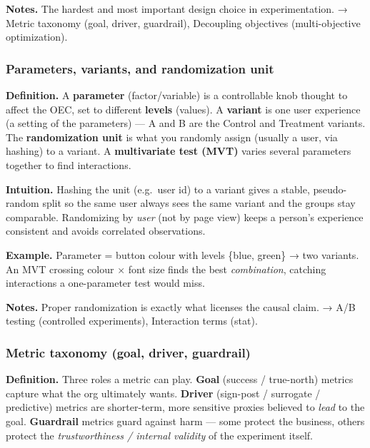 \documentclass[
  10pt,
  letterpaper,
  onecolumn]{article}
\begin{document}
\textbf{Notes.} The hardest and most important design choice in
experimentation. → Metric taxonomy (goal, driver, guardrail), Decoupling
objectives (multi-objective optimization).

\hypertarget{parameters-variants-and-randomization-unit}{%
\subsubsection{Parameters, variants, and randomization
unit}\label{parameters-variants-and-randomization-unit}}

\textbf{Definition.} A \textbf{parameter} (factor/variable) is a
controllable knob thought to affect the OEC, set to different
\textbf{levels} (values). A \textbf{variant} is one user experience (a
setting of the parameters) --- A and B are the Control and Treatment
variants. The \textbf{randomization unit} is what you randomly assign
(usually a user, via hashing) to a variant. A \textbf{multivariate test
(MVT)} varies several parameters together to find interactions.

\textbf{Intuition.} Hashing the unit (e.g.~user id) to a variant gives a
stable, pseudo-random split so the same user always sees the same
variant and the groups stay comparable. Randomizing by \emph{user} (not
by page view) keeps a person's experience consistent and avoids
correlated observations.

\textbf{Example.} Parameter = button colour with levels \{blue, green\}
→ two variants. An MVT crossing colour × font size finds the best
\emph{combination}, catching interactions a one-parameter test would
miss.

\textbf{Notes.} Proper randomization is exactly what licenses the causal
claim. → A/B testing (controlled experiments), Interaction terms (stat).

\hypertarget{metric-taxonomy-goal-driver-guardrail}{%
\subsubsection{Metric taxonomy (goal, driver,
guardrail)}\label{metric-taxonomy-goal-driver-guardrail}}

\textbf{Definition.} Three roles a metric can play. \textbf{Goal}
(success / true-north) metrics capture what the org ultimately wants.
\textbf{Driver} (sign-post / surrogate / predictive) metrics are
shorter-term, more sensitive proxies believed to \emph{lead} to the
goal. \textbf{Guardrail} metrics guard against harm --- some protect the
business, others protect the \emph{trustworthiness / internal validity}
of the experiment itself.
\end{document}
